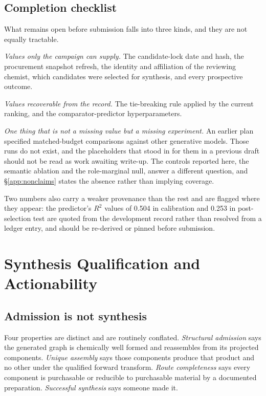 \documentclass{article}
\begin{document}
\subsection{Completion checklist}
\label{app:checklist}

What remains open before submission falls into three kinds, and they are not equally tractable.

\emph{Values only the campaign can supply.} The candidate-lock date and hash, the procurement
snapshot refresh, the identity and affiliation of the reviewing chemist, which candidates were
selected for synthesis, and every prospective outcome.

\emph{Values recoverable from the record.} The tie-breaking rule applied by the current ranking, and
the comparator-predictor hyperparameters.

\emph{One thing that is not a missing value but a missing experiment.} An earlier plan specified
matched-budget comparisons against other generative models. Those runs do not exist, and the
placeholders that stood in for them in a previous draft should not be read as work awaiting
write-up. The controls reported here, the semantic ablation and the role-marginal null, answer a
different question, and \S\ref{app:nonclaims} states the absence rather than implying coverage.

Two numbers also carry a weaker provenance than the rest and are flagged where they appear: the
predictor's $R^2$ values of 0.504 in calibration and 0.253 in post-selection test are quoted from
the development record rather than resolved from a ledger entry, and should be re-derived or pinned
before submission.

\section{Synthesis Qualification and Actionability}
\label{app:synthesis}

\subsection{Admission is not synthesis}
\label{app:admission-ladder}
Four properties are distinct and are routinely conflated. \emph{Structural admission} says the
generated graph is chemically well formed and reassembles from its projected components.
\emph{Unique assembly} says those components produce that product and no other under the qualified
forward transform. \emph{Route completeness} says every component is purchasable or reducible to
purchasable material by a documented preparation. \emph{Successful synthesis} says someone made it.
\end{document}
